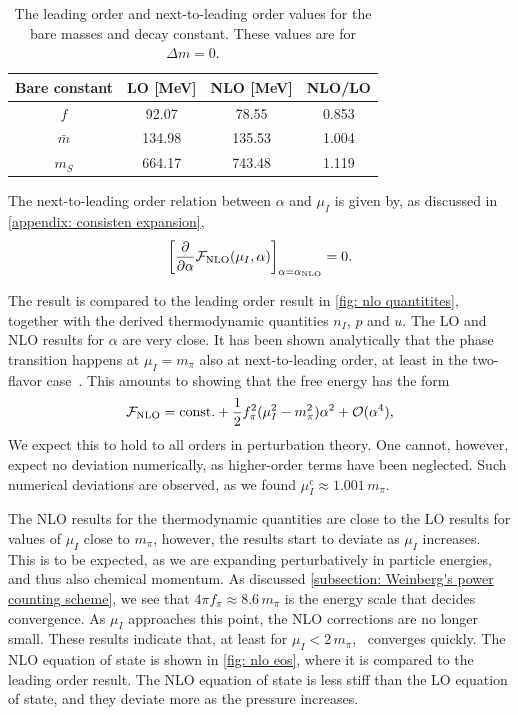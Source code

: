 \begin{table}[!htb]
    \centering
    \caption{The leading order and next-to-leading order values for the bare masses and decay constant. These values are for $\Delta m = 0$.}
    \label{table: nlo values}
    \begin{tabular}{c c c c}
        \hline \hline
        Bare constant & LO [MeV] & NLO [MeV] & NLO/LO \\
        \hline
        $f$ & 92.07 & 78.55 & 0.853\\
        $\bar m$ & 134.98 & 135.53 & 1.004 \\
        $m_S$ & 664.17 & 743.48 & 1.119 \\
        \hline
    \end{tabular}
\end{table}


The next-to-leading order relation between $\alpha$ and $\mu_I$ is given by, as discussed in \autoref{appendix: consisten expansion},
%
\begin{equation}
    \left[\pdv*{\mathcal{F}_\text{NLO}(\mu_I, \alpha)}{\alpha} \right]_{\alpha = \alpha_\text{NLO}} = 0.
\end{equation}
%

The result is compared to the leading order result in \autoref{fig: nlo quantitites}, together with the derived thermodynamic quantities $n_I$, $p$ and $u$.
The LO and NLO results for $\alpha$ are very close.
It has been shown analytically that the phase transition happens at $\mu_I=m_\pi$ also at next-to-leading order, at least in the two-flavor case~\autocite{adhikariTwoflavorChiralPerturbation2019}.
This amounts to showing that the free energy has the form
%
\begin{equation}
    \mathcal{F}_\text{NLO} = \mathrm{const.} + \frac{1}{2} f_\pi^2 (\mu_I^2 - m_\pi^2)\alpha^2 + \mathcal O(\alpha^4),
\end{equation}
%
We expect this to hold to all orders in perturbation theory.
One cannot, however, expect no deviation numerically, as higher-order terms have been neglected.
Such numerical deviations are observed, as we found $\mu_I^c \approx 1.001\,m_\pi$.

The NLO results for the thermodynamic quantities are close to the LO results for values of $\mu_I$ close to $m_\pi$, however, the results start to deviate as $\mu_I$ increases.
This is to be expected, as we are expanding perturbatively in particle energies, and thus also chemical momentum.
As discussed \autoref{subsection: Weinberg's power counting scheme}, we see that $4\pi f_\pi \approx 8.6 \,m_\pi$ is the energy scale that decides convergence.
As $\mu_I$ approaches this point, the NLO corrections are no longer small.
These results indicate that, at least for $\mu_I< 2\,m_\pi$, \chpt\, converges quickly.
The NLO equation of state is shown in \autoref{fig: nlo eos}, where it is compared to the leading order result.
The NLO equation of state is less stiff than the LO equation of state, and they deviate more as the pressure increases.


